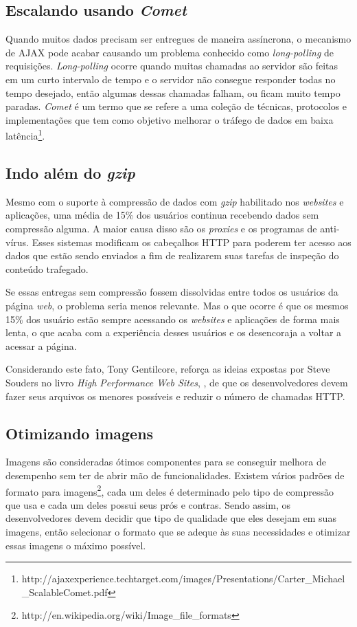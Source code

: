 \subsection{Escalando usando \textit{Comet}}
\label{subsec:evenfaster_cap8}
Quando muitos dados precisam ser entregues de maneira assíncrona, o mecanismo de AJAX pode acabar causando um problema conhecido como \textit{long-polling} de requisições. \textit{Long-polling} ocorre quando muitas chamadas ao servidor são feitas em um curto intervalo de tempo e o servidor não consegue responder todas no tempo desejado, então algumas dessas chamadas falham, ou ficam muito tempo paradas. \textit{Comet} é um termo que se refere a uma coleção de técnicas, protocolos e implementações que tem como objetivo melhorar o tráfego de dados em baixa latência\footnote{http://ajaxexperience.techtarget.com/images/Presentations/Carter\_Michael\_ScalableComet.pdf}.

\subsection{Indo além do \textit{gzip}}
\label{subsec:evenfaster_cap9}
Mesmo com o suporte à compressão de dados com \textit{gzip} habilitado nos \textit{websites} e aplicações, uma média de 15\% dos usuários continua recebendo dados sem compressão alguma. A maior causa disso são os \textit{proxies} e os programas de anti-vírus. Esses sistemas modificam os cabeçalhos HTTP para poderem ter acesso aos dados que estão sendo enviados a fim de realizarem suas tarefas de inspeção do conteúdo trafegado.

Se essas entregas sem compressão fossem dissolvidas entre todos os usuários da página \textit{web}, o problema seria menos relevante. Mas o que ocorre é que os mesmos 15\% dos usuário estão sempre acessando os \textit{websites} e aplicações de forma mais lenta, o que acaba com a experiência desses usuários e os desencoraja a voltar a acessar a página.

Considerando este fato, Tony Gentilcore, reforça as ideias expostas por Steve Souders no livro \textit{High Performance Web Sites}, \cite{HighPerformance}, de que os desenvolvedores devem fazer seus arquivos os menores possíveis e reduzir o número de chamadas HTTP.

\subsection{Otimizando imagens}
\label{subsec:evenfaster_cap10}
Imagens são consideradas ótimos componentes para se conseguir melhora de desempenho sem ter de abrir mão de funcionalidades. Existem vários padrões de formato para imagens\footnote{http://en.wikipedia.org/wiki/Image\_file\_formats}, cada um deles é determinado pelo tipo de compressão que usa e cada um deles possui seus prós e contras. Sendo assim, os desenvolvedores devem decidir que tipo de qualidade que eles desejam em suas imagens, então selecionar o formato que se adeque às suas necessidades e otimizar essas imagens o máximo possível.

